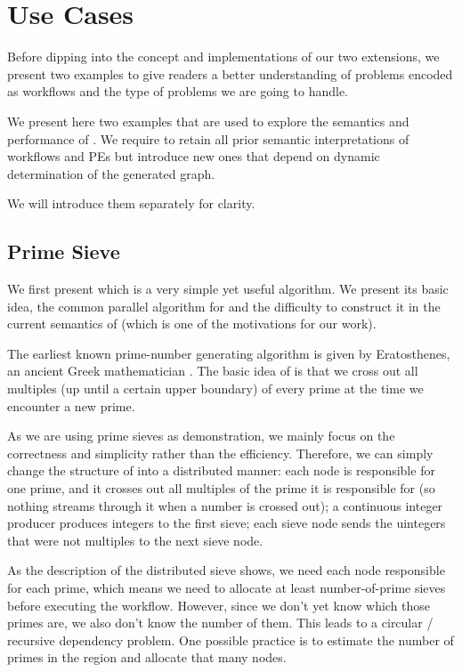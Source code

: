 \chapter{Use Cases}
Before dipping into the concept and implementations of our two extensions, we present two examples to give readers a better understanding of problems encoded as workflows and the type of problems we are going to handle.

We present here two examples that are used to explore the semantics and performance of \dpy. We require to retain all prior semantic interpretations of workflows and PEs but introduce new ones that depend on dynamic determination of the generated graph.

We will introduce them separately for clarity.

\section{Prime Sieve} \label{sec:uc_sieve}
We first present \ttsieve which is a very simple yet useful algorithm. We present its basic idea, the common parallel algorithm for \ttsieve and the difficulty to construct it in the current semantics of \dpy (which is one of the motivations for our work).

The earliest known prime-number generating algorithm is \ttesieve given by Eratosthenes, an ancient Greek mathematician \cite{o2009genuine}. The basic idea of \ttesieve is that we cross out all multiples (up until a certain upper boundary) of every prime at the time we encounter a new prime.

As we are using prime sieves as demonstration, we mainly focus on the correctness and simplicity rather than the efficiency. Therefore, we can simply change the structure of \ttesieve into a distributed manner: each node is responsible for one prime, and it crosses out all multiples of the prime it is responsible for (so nothing streams through it when a number is crossed out); a continuous integer producer produces integers to the first sieve; each sieve node sends the uintegers that were not multiples to the next sieve node.

As the description of the distributed sieve shows, we need each node responsible for each prime, which means we need to allocate at least number-of-prime sieves before executing the workflow. However, since we don't yet know which those primes are, we also don't know the number of them. This leads to a circular / recursive dependency problem. One possible practice is to estimate the number of primes in the region and allocate that many nodes.

